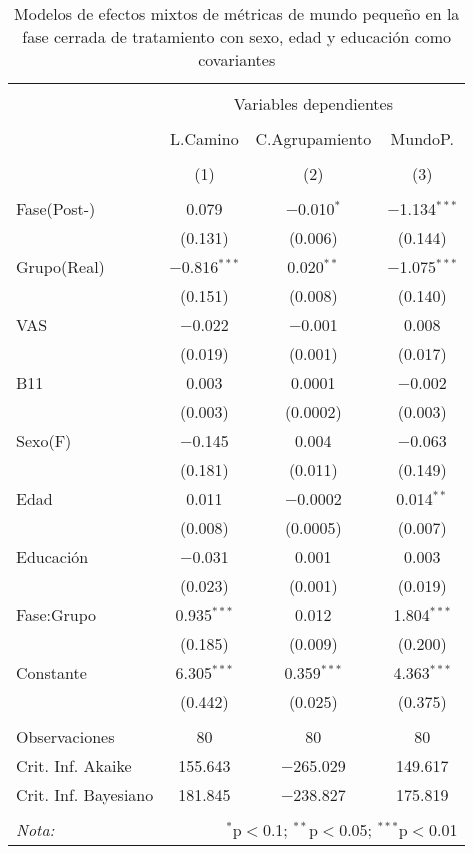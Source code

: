 \begin{table}[!htb] \centering
    \small
  \caption{Modelos de efectos mixtos de métricas de mundo pequeño en la fase cerrada de tratamiento con sexo, edad y educación como covariantes}
  \label{tab:memT2}
\begin{tabular}{@{\extracolsep{5pt}}lccc}
\\[-1.8ex]\hline
\hline \\[-1.8ex]
 & \multicolumn{3}{c}{Variables dependientes} \\
\cline{2-4}
\\[-1.8ex] & L.Camino & C.Agrupamiento & MundoP. \\
\\[-1.8ex] & (1) & (2) & (3)\\
\hline \\[-1.8ex]
 Fase(Post-) & 0.079 & $-$0.010$^{*}$ & $-$1.134$^{***}$ \\
  & (0.131) & (0.006) & (0.144) \\
  Grupo(Real) & $-$0.816$^{***}$ & 0.020$^{**}$ & $-$1.075$^{***}$ \\
  & (0.151) & (0.008) & (0.140) \\
  VAS & $-$0.022 & $-$0.001 & 0.008 \\
  & (0.019) & (0.001) & (0.017) \\
  B11 & 0.003 & 0.0001 & $-$0.002 \\
  & (0.003) & (0.0002) & (0.003) \\
  Sexo(F) & $-$0.145 & 0.004 & $-$0.063 \\
  & (0.181) & (0.011) & (0.149) \\
  Edad & 0.011 & $-$0.0002 & 0.014$^{**}$ \\
  & (0.008) & (0.0005) & (0.007) \\
  Educación & $-$0.031 & 0.001 & 0.003 \\
  & (0.023) & (0.001) & (0.019) \\
  Fase:Grupo & 0.935$^{***}$ & 0.012 & 1.804$^{***}$ \\
  & (0.185) & (0.009) & (0.200) \\
  Constante & 6.305$^{***}$ & 0.359$^{***}$ & 4.363$^{***}$ \\
  & (0.442) & (0.025) & (0.375) \\
 \hline \\[-1.8ex]
Observaciones & 80 & 80 & 80 \\
Crit. Inf. Akaike & 155.643 & $-$265.029 & 149.617 \\
Crit. Inf. Bayesiano & 181.845 & $-$238.827 & 175.819 \\
\hline
\hline \\[-1.8ex]
\textit{Nota:}  & \multicolumn{3}{r}{$^{*}$p$<$0.1; $^{**}$p$<$0.05; $^{***}$p$<$0.01} \\
\end{tabular}
\end{table}


